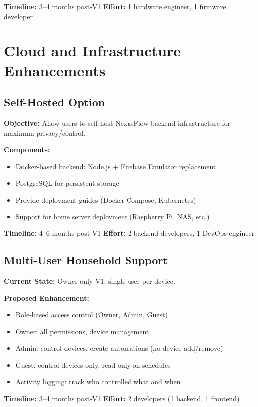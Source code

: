 \textbf{Timeline:} 3–4 months post-V1
\textbf{Effort:} 1 hardware engineer, 1 firmware developer

\section{Cloud and Infrastructure Enhancements}

\subsection{Self-Hosted Option}

\textbf{Objective:} Allow users to self-host NexusFlow backend infrastructure for maximum privacy/control.

\textbf{Components:}
\begin{itemize}
    \item Docker-based backend: Node.js + Firebase Emulator replacement
    \item PostgreSQL for persistent storage
    \item Provide deployment guides (Docker Compose, Kubernetes)
    \item Support for home server deployment (Raspberry Pi, NAS, etc.)
\end{itemize}

\textbf{Timeline:} 4–6 months post-V1
\textbf{Effort:} 2 backend developers, 1 DevOps engineer

\subsection{Multi-User Household Support}

\textbf{Current State:} Owner-only V1; single user per device.

\textbf{Proposed Enhancement:}
\begin{itemize}
    \item Role-based access control (Owner, Admin, Guest)
    \item Owner: all permissions, device management
    \item Admin: control devices, create automations (no device add/remove)
    \item Guest: control devices only, read-only on schedules
    \item Activity logging: track who controlled what and when
\end{itemize}

\textbf{Timeline:} 3–4 months post-V1
\textbf{Effort:} 2 developers (1 backend, 1 frontend)

